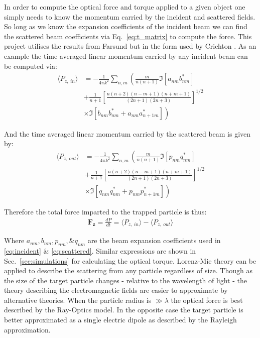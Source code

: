 In order to compute the optical force and torque applied to a 
given object one simply needs to know the momentum carried by 
the incident and scattered fields. So long as we know the 
expansion coefficients of the incident beam we can find the 
scattered beam coefficients via Eq.~\eqref{eq:t_matrix} to 
compute the force. This project utilises the results from 
Farsund \cite{Farsund1996} but in the form used by Crichton 
\cite{Crichton2000THEMD}. As an example the time averaged linear 
momentum carried by any incident beam can be computed via:
\begin{equation}
	\label{eq:linear_momentum_in}
	\begin{split}
		\langle P_{z,\ in} \rangle
		&=
		-\frac{1}{4\pi k^2}\sum_{n,m} \left(\frac{m}{n(n+1)}\Im[a_{nm}b^*_{nm}] \right.
		\\ 
		&+\frac{1}{n+1}\left[\frac{n(n+2)(n-m+1)(n+m+1)}{(2n+1)(2n+3)} \right]^{1/2}
		\\
		& \left.\times\Im[b_{nm}b^*_{nm}+a_{nm}a^*_{n+1m}] \right)
	\end{split}
\end{equation}

And the time averaged linear momentum carried by the scattered 
beam is given by:
\begin{equation}
	\label{eq:linear_momentum_out}
	\begin{split}
		\langle P_{z,\ out} \rangle
		&=
		-\frac{1}{4\pi k^2}\sum_{n,m} \left(\frac{m}{n(n+1)}\Im[p_{nm}q^*_{nm}] \right.
		\\ 
		&+\frac{1}{n+1}\left[\frac{n(n+2)(n-m+1)(n+m+1)}{(2n+1)(2n+3)} \right]^{1/2}
		\\
		& \left.\times\Im[q_{nm}q^*_{nm}+p_{nm}p^*_{n+1m}] \right)
	\end{split}
\end{equation}

Therefore the total force imparted to the trapped particle is thus:
\begin{align}
	\boldsymbol{F_z} =\frac{dP}{dt} = \langle P_{z,\ in}\rangle 
	-\langle P_{z,\ out}\rangle
	\label{eq:Fz}
\end{align}

\noindent
Where $a_{nm}, b_{nm}, p_{nm}, \& q_{nm}$ are the beam expansion 
coefficients used in \eqref{eq:incident} \& \eqref{eq:scattered}.
Similar expressions are shown in Sec.~\ref{sec:simulations} for 
calculating the optical torque. Lorenz-Mie theory can be applied 
to describe the scattering from any particle regardless of size.
Though as the size of the target particle changes - relative to 
the wavelength of light - the theory describing the electromagnetic 
fields are easier to approximate by alternative theories. When the 
particle radius is $\gg \lambda$ the optical force is best described 
by the Ray-Optics model. In the opposite case the target particle is 
better approximated as a single electric dipole as described by 
the Rayleigh approximation.  

